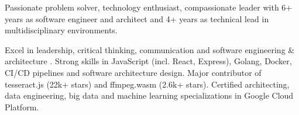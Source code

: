 

\begin{cvparagraph}

Passionate problem solver, technology enthusiast, compassionate leader with 6+ years as software engineer and architect and 4+ years as technical lead in multidisciplinary environments.

  Excel in leadership, critical thinking, communication and software engineering \& architecture . Strong skills in JavaScript (incl. React, Express), Golang, Docker, CI/CD pipelines and software architecture design. Major contributor of tesseract.js (22k+ stars) and ffmpeg.wasm (2.6k+ stars). Certified architecting, data engineering, big data and machine learning specializations in Google Cloud Platform. 
\end{cvparagraph}
